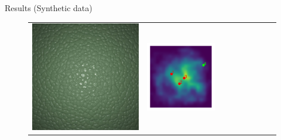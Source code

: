 \documentclass[final]{beamer}
\newlength{\twocolwid}
\newlength{\resultwidth}
\begin{document}
\begin{frame}[t]
\begin{columns}[t]
\begin{column}{\twocolwid}
\begin{block}{Results (Synthetic data)}
\begin{figure}[t]
\begin{tabular}{ccrclcccc}
            		\includegraphics[width=\resultwidth]{images/synth/leather/optim.jpg} &
            		\includegraphics[width=\resultwidth]{images/synth/leather/posterior.pdf} &

\end{tabular}
\end{figure}
\end{block}
\end{column}
\end{columns}
\end{frame}
\end{document}
